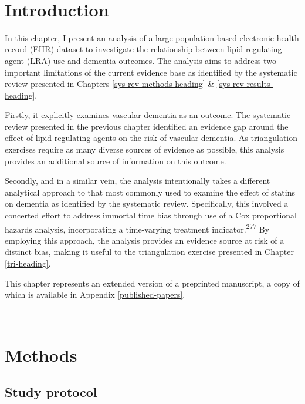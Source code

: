 \documentclass[a4paper, twoside]{templates/ociamthesis}
\begin{document}
~

\hypertarget{introduction-2}{%
\section{Introduction}\label{introduction-2}}

In this chapter, I present an analysis of a large population-based electronic health record (EHR) dataset to investigate the relationship between lipid-regulating agent (LRA) use and dementia outcomes. The analysis aims to address two important limitations of the current evidence base as identified by the systematic review presented in Chapters \ref{sys-rev-methods-heading} \& \ref{sys-rev-results-heading}.

Firstly, it explicitly examines vascular dementia as an outcome. The systematic review presented in the previous chapter identified an evidence gap around the effect of lipid-regulating agents on the risk of vascular dementia. As triangulation exercises require as many diverse sources of evidence as possible, this analysis provides an additional source of information on this outcome.

Secondly, and in a similar vein, the analysis intentionally takes a different analytical approach to that most commonly used to examine the effect of statins on dementia as identified by the systematic review. Specifically, this involved a concerted effort to address immortal time bias through use of a Cox proportional hazards analysis, incorporating a time-varying treatment indicator.\textsuperscript{\protect\hyperlink{ref-suissa2008}{277}} By employing this approach, the analysis provides an evidence source at risk of a distinct bias, making it useful to the triangulation exercise presented in Chapter \ref{tri-heading}.

This chapter represents an extended version of a preprinted manuscript, a copy of which is available in Appendix \ref{published-papers}.

~

\hypertarget{methods-1}{%
\section{Methods}\label{methods-1}}

\hypertarget{study-protocol}{%
\subsection{Study protocol}\label{study-protocol}}
\end{document}

